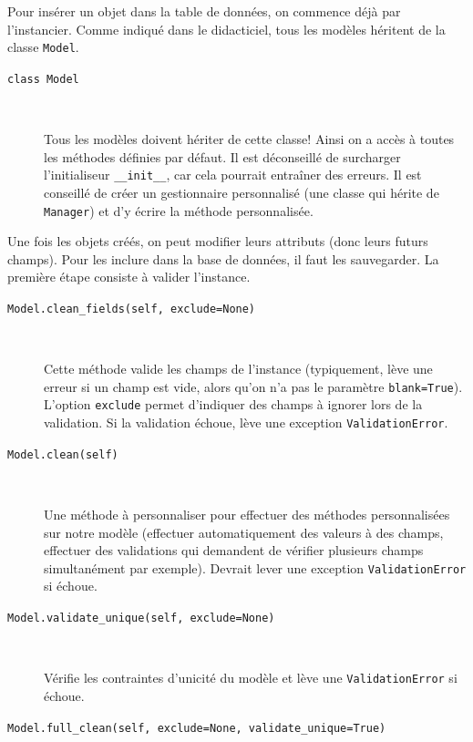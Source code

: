 \documentclass[a4paper, 10pt]{article}
\begin{document}
{Pour insérer un objet dans la table de données, on commence déjà par l'instancier. Comme indiqué dans le didacticiel, tous les modèles héritent de la classe \texttt{Model}.

\begin{description}
    \item[\texttt{class Model}]~

    Tous les modèles doivent hériter de cette classe! Ainsi on a accès à toutes les méthodes définies par défaut. Il est déconseillé de surcharger l'initialiseur \texttt{__init__}, car cela pourrait entraîner des erreurs. Il est conseillé de créer un gestionnaire personnalisé (une classe qui hérite de \texttt{Manager}) et d'y écrire la méthode personnalisée.
\end{description}

Une fois les objets créés, on peut modifier leurs attributs (donc leurs futurs champs). Pour les inclure dans la base de données, il faut les sauvegarder. La première étape consiste à valider l'instance.

\begin{description}
    \item[\texttt{Model.clean_fields(self, exclude=None)}]~

    Cette méthode valide les champs de l'instance (typiquement, lève une erreur si un champ est vide, alors qu'on n'a pas le paramètre \texttt{blank=True}). L'option \texttt{exclude} permet d'indiquer des champs à ignorer lors de la validation. Si la validation échoue, lève une exception \texttt{ValidationError}.

    \item[\texttt{Model.clean(self)}]~

    Une méthode à personnaliser pour effectuer des méthodes personnalisées sur notre modèle (effectuer automatiquement des valeurs à des champs, effectuer des validations qui demandent de vérifier plusieurs champs simultanément par exemple). Devrait lever une exception \texttt{ValidationError} si échoue.

    \item[\texttt{Model.validate_unique(self, exclude=None)}]~

    Vérifie les contraintes d'unicité du modèle et lève une \texttt{ValidationError} si échoue.

    \item[\texttt{Model.full_clean(self, exclude=None, validate_unique=True)}]~


\end{description}}
\end{document}
